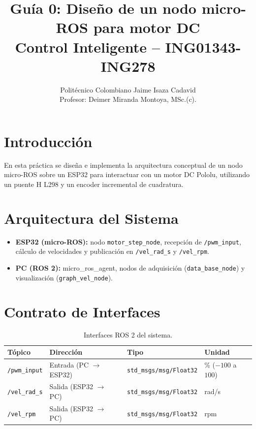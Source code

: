 \documentclass[11pt,a4paper]{article}
\title{\textbf{Guía 0: Diseño de un nodo micro-ROS para motor DC}\\Control Inteligente -- ING01343-ING278}
\author{Politécnico Colombiano Jaime Isaza Cadavid\\Profesor: Deimer Miranda Montoya, MSc.(c).}
\date{}
\begin{document}
\maketitle

\section{Introducción}
En esta práctica se diseña e implementa la arquitectura conceptual de un nodo micro-ROS sobre un ESP32 para interactuar con un motor DC Pololu, utilizando un puente H L298 y un encoder incremental de cuadratura.

\section{Arquitectura del Sistema}
\begin{itemize}
    \item \textbf{ESP32 (micro-ROS):} nodo \texttt{motor\_step\_node}, recepción de \texttt{/pwm\_input}, cálculo de velocidades y publicación en \texttt{/vel\_rad\_s} y \texttt{/vel\_rpm}.
    \item \textbf{PC (ROS 2):} micro\_ros\_agent, nodos de adquisición (\texttt{data\_base\_node}) y visualización (\texttt{graph\_vel\_node}).
\end{itemize}

\section{Contrato de Interfaces}
\begin{table}[h!]
\centering
\begin{tabular}{|l|l|l|l|}
\hline
\textbf{Tópico} & \textbf{Dirección} & \textbf{Tipo} & \textbf{Unidad} \\ \hline
\texttt{/pwm\_input} & Entrada (PC $\to$ ESP32) & \texttt{std\_msgs/msg/Float32} & \% ($-100$ a $100$) \\ \hline
\texttt{/vel\_rad\_s} & Salida (ESP32 $\to$ PC) & \texttt{std\_msgs/msg/Float32} & rad/s \\ \hline
\texttt{/vel\_rpm} & Salida (ESP32 $\to$ PC) & \texttt{std\_msgs/msg/Float32} & rpm \\ \hline
\end{tabular}
\caption{Interfaces ROS 2 del sistema.}
\end{table}
\end{document}
